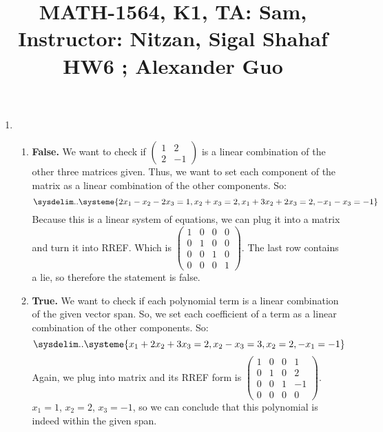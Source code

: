 \documentclass{article}
\title{\large{\vspace{-1.0cm}MATH-1564, K1, TA: Sam, Instructor: Nitzan, Sigal Shahaf \\ HW6 ; Alexander Guo}}
\date{}
\begin{document}
\maketitle

\vspace{-1.5cm}
\large

\begin{enumerate}

\item

\begin{enumerate}

\item \textbf{False.} We want to check if $\left(\begin{array}{cc} 1 & 2 \\ 2 & -1 \end{array}\right)$ is a linear combination of the other three matrices given. Thus, we want to set each component of the matrix as a linear combination of the other components. So: 
\[\sysdelim..\systeme{
2x_1 - x_2 - 2x_3 = 1,
          x_2 + x_3 = 2,
x_1 +3x_2 + 2x_3 = 2,
-x_1 - x_3 = -1
}\]
Because this is a linear system of equations, we can plug it into a matrix and turn it into RREF. Which is 
$\left(\begin{array}{ccc|c} 1 & 0 & 0 & 0 \\ 0 & 1 & 0 & 0 \\ 0 & 0 & 1 & 0 \\ 0 & 0 & 0 & 1 \end{array}\right)$. The last row contains a lie, so therefore the statement is false.

\item \textbf{True.} We want to check if each polynomial term is a linear combination of the given vector span. So, we set each coefficient of a term as a linear combination of the other components. So:
\[\sysdelim..\systeme{
x_1 + 2x_2 + 3x_3 = 2,
x_2 -x_3 = 3,
x_2 = 2,
-x_1 = -1
}\]
Again, we plug into matrix and its RREF form is $\left(\begin{array}{ccc|c} 1 & 0 & 0 & 1 \\ 0 & 1 & 0 & 2 \\ 0 & 0 & 1 & -1 \\ 0 & 0 & 0 & 0 \end{array}\right)$. $x_1 = 1$, $x_2 = 2$, $x_3 = -1$, so we can conclude that this polynomial is indeed within the given span.


\end{enumerate}
\end{enumerate}
\end{document}
